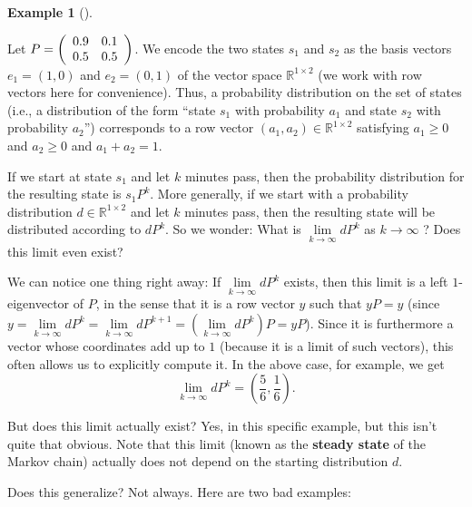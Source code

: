 \documentclass[numbers=enddot,12pt,final,onecolumn,notitlepage]{scrartcl}%
\numberwithin{exer}{subsection}
\theoremstyle{definition}
\newtheorem{exam}[theo]{Example}
\newenvironment{example}[1][]
{\begin{exam}[#1]\begin{leftbar}}
{\end{leftbar}\end{exam}}
\begin{document}
\begin{example}
Let $P=\left(
\begin{array}
[c]{cc}%
0.9 & 0.1\\
0.5 & 0.5
\end{array}
\right)  $. We encode the two states $s_{1}$ and $s_{2}$ as the basis vectors
$e_{1}=\left(  1,0\right)  $ and $e_{2}=\left(  0,1\right)  $ of the vector
space $\mathbb{R}^{1\times2}$ (we work with row vectors here for convenience).
Thus, a probability distribution on the set of states (i.e., a distribution of
the form \textquotedblleft state $s_{1}$ with probability $a_{1}$ and state
$s_{2}$ with probability $a_{2}$\textquotedblright) corresponds to a row
vector $\left(  a_{1},a_{2}\right)  \in\mathbb{R}^{1\times2}$ satisfying
$a_{1}\geq0$ and $a_{2}\geq0$ and $a_{1}+a_{2}=1$.

If we start at state $s_{1}$ and let $k$ minutes pass, then the probability
distribution for the resulting state is $s_{1}P^{k}$. More generally, if we
start with a probability distribution $d\in\mathbb{R}^{1\times2}$ and let $k$
minutes pass, then the resulting state will be distributed according to
$dP^{k}$. So we wonder: What is $\lim\limits_{k\rightarrow\infty}dP^{k}$ as
$k\rightarrow\infty$ ? Does this limit even exist?

We can notice one thing right away: If $\lim\limits_{k\rightarrow\infty}%
dP^{k}$ exists, then this limit is a left $1$-eigenvector of $P$, in the sense
that it is a row vector $y$ such that $yP=y$ (since $y=\lim
\limits_{k\rightarrow\infty}dP^{k}=\lim\limits_{k\rightarrow\infty}%
dP^{k+1}=\left(  \lim\limits_{k\rightarrow\infty}dP^{k}\right)  P=yP$). Since
it is furthermore a vector whose coordinates add up to $1$ (because it is a
limit of such vectors), this often allows us to explicitly compute it. In the
above case, for example, we get
\[
\lim\limits_{k\rightarrow\infty}dP^{k}=\left(  \dfrac{5}{6},\dfrac{1}%
{6}\right)  .
\]


But does this limit actually exist? Yes, in this specific example, but this
isn't quite that obvious. Note that this limit (known as the \textbf{steady
state} of the Markov chain) actually does not depend on the starting
distribution $d$.
\end{example}

Does this generalize? Not always. Here are two bad examples:
\end{document}
